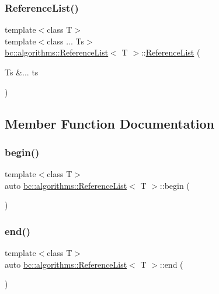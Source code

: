 \subsubsection{\texorpdfstring{Reference\+List()}{ReferenceList()}}
{\footnotesize\ttfamily template$<$class T$>$ \\
template$<$class ... Ts$>$ \\
\hyperlink{structbc_1_1algorithms_1_1ReferenceList}{bc\+::algorithms\+::\+Reference\+List}$<$ T $>$\+::\hyperlink{structbc_1_1algorithms_1_1ReferenceList}{Reference\+List} (\begin{DoxyParamCaption}\item[{Ts \&...}]{ts }\end{DoxyParamCaption})\hspace{0.3cm}{\ttfamily [inline]}}



\subsection{Member Function Documentation}
\mbox{\label{structbc_1_1algorithms_1_1ReferenceList_af26b51906d89718a1b0056bb48788df9}} 
\subsubsection{\texorpdfstring{begin()}{begin()}}
{\footnotesize\ttfamily template$<$class T$>$ \\
auto \hyperlink{structbc_1_1algorithms_1_1ReferenceList}{bc\+::algorithms\+::\+Reference\+List}$<$ T $>$\+::begin (\begin{DoxyParamCaption}{ }\end{DoxyParamCaption})\hspace{0.3cm}{\ttfamily [inline]}}

\mbox{\label{structbc_1_1algorithms_1_1ReferenceList_a4ab96a5c41b1f87ae3945b59bb6a2268}} 
\subsubsection{\texorpdfstring{end()}{end()}}
{\footnotesize\ttfamily template$<$class T$>$ \\
auto \hyperlink{structbc_1_1algorithms_1_1ReferenceList}{bc\+::algorithms\+::\+Reference\+List}$<$ T $>$\+::end (\begin{DoxyParamCaption}{ }\end{DoxyParamCaption})\hspace{0.3cm}{\ttfamily [inline]}}



